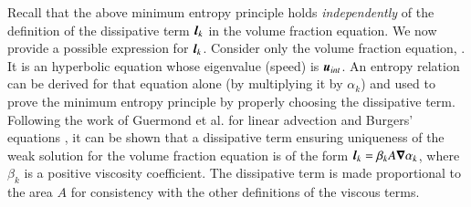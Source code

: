 \documentclass[preprint,10pt]{elsarticle}
\begin{document}
Recall that the above minimum entropy principle holds {\it independently} of the definition of the dissipative term $\boldsymbol l_k$
in the volume fraction equation. We now provide a possible expression for $\boldsymbol l_k$.
%
Consider only the volume fraction equation, . It is an hyperbolic equation
whose eigenvalue (speed) is $\boldsymbol u_{int}$. An entropy relation can be derived for that equation alone (by multiplying it by $\alpha_k$)
and used to prove the minimum entropy principle by properly choosing the dissipative term.
Following
the work of Guermond et al. for linear advection and Burgers' equations \cite{jlg1, jlg2}, it can be shown that a dissipative term ensuring 
uniqueness of the weak solution for the volume fraction equation is of the form $\boldsymbol l_k = \beta_k A \boldsymbol\nabla \alpha_k $, where $\beta_k$
is a positive viscosity coefficient. The dissipative term is made proportional to the area $A$ for consistency with 
the other definitions of the viscous terms.
\end{document}
